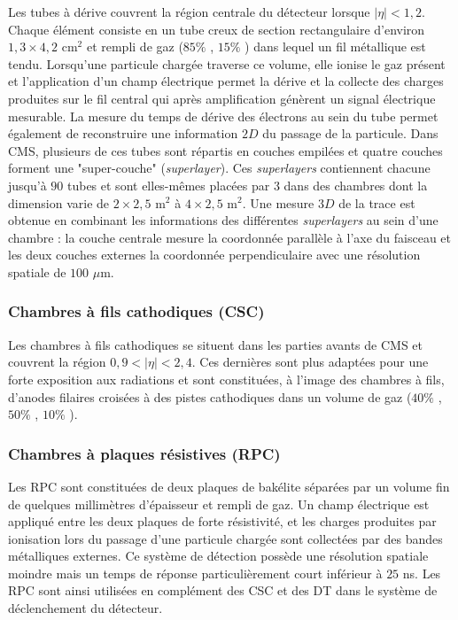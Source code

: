 Les tubes à dérive couvrent la région centrale du détecteur lorsque $|\eta|<1,2$. Chaque élément consiste en un tube creux de section rectangulaire d'environ $1,3\times4,2$ cm$^2$ et rempli de gaz ($85\%$ , $15\%$ ) dans lequel un fil métallique est tendu. Lorsqu'une particule chargée traverse ce volume, elle ionise le gaz présent et l'application d'un champ électrique permet la dérive et la collecte des charges produites sur le fil central qui après amplification génèrent un signal électrique mesurable. La mesure du temps de dérive des électrons au sein du tube permet également de reconstruire une information $2D$ du passage de la particule. Dans CMS, plusieurs de ces tubes sont répartis en couches empilées et quatre couches forment une "super-couche" (\textit{superlayer}). Ces \textit{superlayers} contiennent chacune jusqu'à $90$ tubes et sont elles-mêmes placées par $3$ dans des chambres dont la dimension varie de $2\times2,5$ m$^2$ à $4\times2,5$ m$^2$. Une mesure $3D$ de la trace est obtenue en combinant les informations des différentes \textit{superlayers} au sein d'une chambre : la couche centrale mesure la coordonnée parallèle à l'axe du faisceau et les deux couches externes la coordonnée perpendiculaire avec une résolution spatiale de $100$ $\mu$m.

\subsubsection{ Chambres à fils cathodiques (CSC)}

Les chambres à fils cathodiques se situent dans les parties avants de CMS et couvrent la région $0,9<|\eta|<2,4$. Ces dernières sont plus adaptées pour une forte exposition aux radiations et sont constituées, à l'image des chambres à fils, d'anodes filaires croisées à des pistes cathodiques dans un volume de gaz ($40\%$ , $50\%$ , $10\%$ ).

\subsubsection{ Chambres à plaques résistives (RPC)}

Les RPC sont constituées de deux plaques de bakélite séparées par un volume fin de quelques millimètres d'épaisseur et rempli de gaz. Un champ électrique est appliqué entre les deux plaques de forte résistivité, et les charges produites par ionisation lors du passage d'une particule chargée sont collectées par des bandes métalliques externes. Ce système de détection possède une résolution spatiale moindre mais un temps de réponse particulièrement court inférieur à $25$ ns. Les RPC sont ainsi utilisées en complément des CSC et des DT dans le système de déclenchement du détecteur. \\

